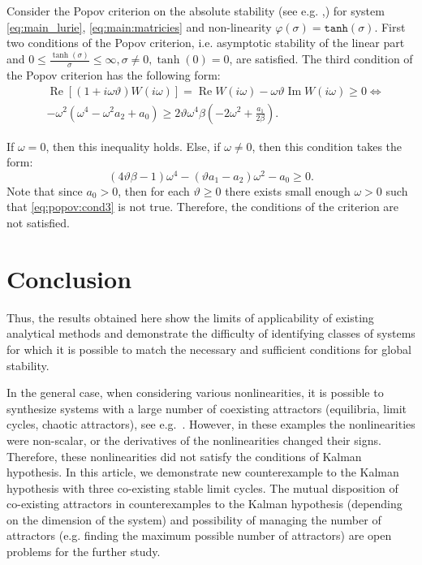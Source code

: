 \documentclass{ifacconf}
\theoremstyle{plain}
\begin{document}
Consider the Popov criterion on the absolute stability
(see e.g. \citep[p.~961]{Popov-1961},\cite[p.~79]{YakubovichLG-2004})
for system \eqref{eq:main_lurie}, \eqref{eq:main:matricies}
and non-linearity $\varphi(\sigma) = \texttt{tanh}(\sigma)$.
First two conditions of the Popov criterion, i.e. asymptotic stability of the linear part and
$0 \leq \frac{\tanh(\sigma)}{\sigma} \leq \infty, \sigma \neq 0, \tanh(0) = 0$, are satisfied.
The third condition of the Popov criterion has the following form:
\begin{equation*}\label{eq:popov}
	\begin{aligned}
		&\operatorname{Re}[(1+i\omega\vartheta)W(i\omega)] = \operatorname{Re}W(i\omega) - \omega\vartheta\operatorname{Im}W(i\omega) \geq 0 \Leftrightarrow \\
		&-\omega^2(\omega^4-\omega^2a_2+a_0) \geq 2\vartheta\omega^4\beta\left(-2\omega^2+\frac{a_1}{2\beta}\right).
	\end{aligned}
\end{equation*}

If $\omega = 0$, then this inequality holds.
Else, if $\omega \neq 0$, then this condition takes the form:
\begin{equation}\label{eq:popov:cond3}
		(4\vartheta\beta-1)\omega^4 - (\vartheta a_1 - a_2)\omega^2-a_0 \geq 0.
\end{equation}
Note that since $a_0 >0$, then for each $\vartheta \geq 0$ there exists small
enough $\omega > 0$ such that \eqref{eq:popov:cond3} is not true.
Therefore, the conditions of the criterion are not satisfied.

\section{Conclusion}

Thus, the results obtained here show the limits of applicability of existing analytical methods
and demonstrate the difficulty of identifying classes of systems for which
it is possible to match the necessary and sufficient conditions for global stability.

In the general case, when considering various nonlinearities, it is possible to synthesize
systems with a large number of coexisting attractors (equilibria, limit cycles, chaotic attractors),
see e.g.~\citep{WangC-2013,ZhangC-2017,StankevichKLC-2017,KuznetsovKLMS-2017-IFAC,ChenKLM-2017-IJBC}.
However, in these examples
the nonlinearities were non-scalar, or
the derivatives of the nonlinearities changed their signs.
Therefore, these nonlinearities did not satisfy the conditions of Kalman hypothesis.
In this article, we demonstrate new counterexample to the Kalman hypothesis with
three co-existing stable limit cycles.
The mutual disposition
of co-existing attractors in counterexamples to the Kalman hypothesis
(depending on the dimension of the system)
and possibility of managing the number of attractors
(e.g. finding the maximum possible number of attractors)
are open problems for the further study.
\end{document}

